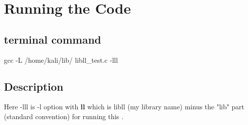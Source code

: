 \documentclass{article}
\begin{document}
\section{Running the Code}
\subsection{terminal command}
gcc -L /home/kali/lib/ libll\_test.c -lll
\subsection{Description}
Here -lll is -l option with \textbf{ll} which is libll (my library name) minus the "lib" part (standard convention) for running this .  
\end{document}
